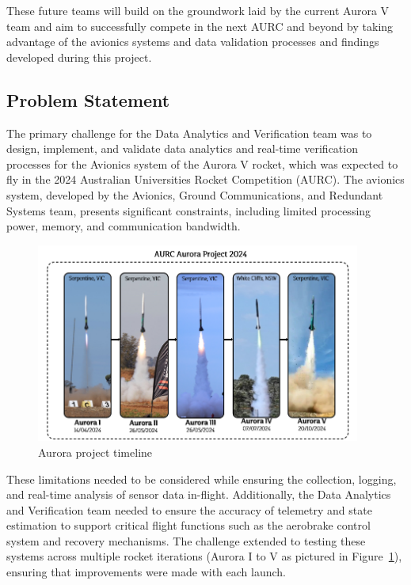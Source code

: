 These future teams will build on the groundwork laid by the current Aurora V team and aim to successfully compete in the next AURC and beyond by taking advantage of the avionics systems and data validation processes and findings developed during this project. 

\subsection{Problem Statement}
The primary challenge for the Data Analytics and Verification team was to design, implement, and validate data analytics and real-time verification processes for the Avionics system of the Aurora V rocket, which was expected to fly in the 2024 Australian Universities Rocket Competition (AURC). The avionics system, developed by the Avionics, Ground Communications, and Redundant Systems team, presents significant constraints, including limited processing power, memory, and communication bandwidth.

\begin{figure}[h]
    \begin{center}
        \includegraphics[width=0.95\textwidth]{./img/aurora.png}
    \end{center}
    \caption{Aurora project timeline}\label{fig:aurora}
\end{figure}

These limitations needed to be considered while ensuring the collection, logging, and real-time analysis of sensor data in-flight. Additionally, the Data Analytics and Verification team needed to ensure the accuracy of telemetry and state estimation to support critical flight functions such as the aerobrake control system and recovery mechanisms. The challenge extended to testing these systems across multiple rocket iterations (Aurora I to V as pictured in Figure~\ref{fig:aurora}), ensuring that improvements were made with each launch.

